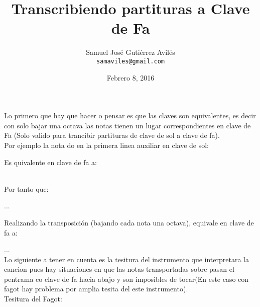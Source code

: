 \documentclass[11pt,letterpaper,oneside]{article}
\title { Transcribiendo partituras a Clave de Fa }
\author{ Samuel Jos\'e Guti\'errez Avil\'es \\ \texttt{samaviles@gmail.com} }
\date{ Febrero 8, 2016 }
\begin{document}
	\maketitle
  
	Lo primero que hay que hacer o pensar es que las claves son equivalentes,
	es decir con solo bajar una octava las notas tienen un lugar correspondientes
	en clave de Fa (Solo valido para trancibir partituras de clave de sol a clave de fa).\\
  
	Por ejemplo la nota do en la primera linea auxiliar en clave de sol:
	
	{%
\parindent 0pt
\noindent
\ifx\preLilyPondExample \undefined
\else
  \expandafter\preLilyPondExample
\fi
\def\lilypondbook{}%

\ifx\postLilyPondExample \undefined
\else
  \expandafter\postLilyPondExample
\fi
}
  
	Es quivalente en clave de fa a:
  
	{%
\parindent 0pt
\noindent
\ifx\preLilyPondExample \undefined
\else
  \expandafter\preLilyPondExample
\fi
\def\lilypondbook{}%

\ifx\postLilyPondExample \undefined
\else
  \expandafter\postLilyPondExample
\fi
}\\
  
	Por tanto que:
  
	{%
\parindent 0pt
\noindent
\ifx\preLilyPondExample \undefined
\else
  \expandafter\preLilyPondExample
\fi
\def\lilypondbook{}%

\ifx\postLilyPondExample \undefined
\else
  \expandafter\postLilyPondExample
\fi
} ...
  
	Realizando la transposici\'on (bajando cada nota una octava), equivale en clave de fa a:
	
	{%
\parindent 0pt
\noindent
\ifx\preLilyPondExample \undefined
\else
  \expandafter\preLilyPondExample
\fi
\def\lilypondbook{}%

\ifx\postLilyPondExample \undefined
\else
  \expandafter\postLilyPondExample
\fi
} ...\\
	
	Lo siguiente a tener en cuenta es la tesitura del instrumento que interpretara
	la cancion pues hay situaciones en que las notas transportadas sobre pasan 
	el pentrama co clave de fa hacia abajo y son imposibles de tocar(En este 
	caso con fagot hay problema por amplia tesita del este instrumento).\\
  
	Tesitura del Fagot:
	
\end{document}
